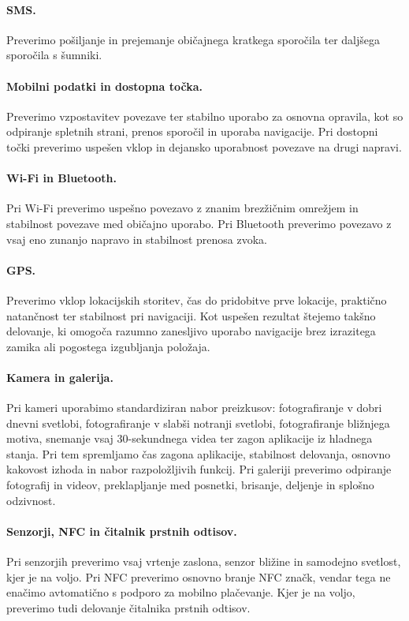 \documentclass[a4paper,12pt,openright]{book}
\begin{document}
\paragraph{SMS.}
Preverimo pošiljanje in prejemanje običajnega kratkega sporočila ter daljšega sporočila s šumniki.

\paragraph{Mobilni podatki in dostopna točka.}
Preverimo vzpostavitev povezave ter stabilno uporabo za osnovna opravila, kot so odpiranje spletnih strani, prenos sporočil in uporaba navigacije.
Pri dostopni točki preverimo uspešen vklop in dejansko uporabnost povezave na drugi napravi.

\paragraph{Wi-Fi in Bluetooth.}
Pri Wi-Fi preverimo uspešno povezavo z znanim brezžičnim omrežjem in stabilnost povezave med običajno uporabo.
Pri Bluetooth preverimo povezavo z vsaj eno zunanjo napravo in stabilnost prenosa zvoka.

\paragraph{GPS.}
Preverimo vklop lokacijskih storitev, čas do pridobitve prve lokacije, praktično natančnost ter stabilnost pri navigaciji.
Kot uspešen rezultat štejemo takšno delovanje, ki omogoča razumno zanesljivo uporabo navigacije brez izrazitega zamika ali pogostega izgubljanja položaja.

\paragraph{Kamera in galerija.}
Pri kameri uporabimo standardiziran nabor preizkusov: fotografiranje v dobri dnevni svetlobi, fotografiranje v slabši notranji svetlobi, fotografiranje bližnjega motiva, snemanje vsaj 30-sekundnega videa ter zagon aplikacije iz hladnega stanja.
Pri tem spremljamo čas zagona aplikacije, stabilnost delovanja, osnovno kakovost izhoda in nabor razpoložljivih funkcij.
Pri galeriji preverimo odpiranje fotografij in videov, preklapljanje med posnetki, brisanje, deljenje in splošno odzivnost.

\paragraph{Senzorji, NFC in čitalnik prstnih odtisov.}
Pri senzorjih preverimo vsaj vrtenje zaslona, senzor bližine in samodejno svetlost, kjer je na voljo.
Pri NFC preverimo osnovno branje NFC značk, vendar tega ne enačimo avtomatično s podporo za mobilno plačevanje.
Kjer je na voljo, preverimo tudi delovanje čitalnika prstnih odtisov.
\end{document}
